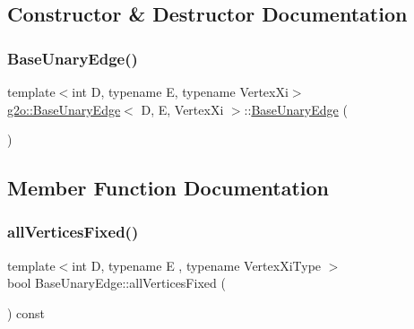 \subsection{Constructor \& Destructor Documentation}
\mbox{\label{classg2o_1_1_base_unary_edge_a7375d1ebfb57ba0308f863739b817b15}} 
\subsubsection{\texorpdfstring{Base\+Unary\+Edge()}{BaseUnaryEdge()}}
{\footnotesize\ttfamily template$<$int D, typename E, typename Vertex\+Xi$>$ \\
\mbox{\hyperlink{classg2o_1_1_base_unary_edge}{g2o\+::\+Base\+Unary\+Edge}}$<$ D, E, Vertex\+Xi $>$\+::\mbox{\hyperlink{classg2o_1_1_base_unary_edge}{Base\+Unary\+Edge}} (\begin{DoxyParamCaption}{ }\end{DoxyParamCaption})\hspace{0.3cm}{\ttfamily [inline]}}



\subsection{Member Function Documentation}
\mbox{\label{classg2o_1_1_base_unary_edge_a4c5ec31144a266fb059b73b2387456c1}} 
\subsubsection{\texorpdfstring{all\+Vertices\+Fixed()}{allVerticesFixed()}}
{\footnotesize\ttfamily template$<$int D, typename E , typename Vertex\+Xi\+Type $>$ \\
bool Base\+Unary\+Edge\+::all\+Vertices\+Fixed (\begin{DoxyParamCaption}{ }\end{DoxyParamCaption}) const\hspace{0.3cm}{\ttfamily [virtual]}}



